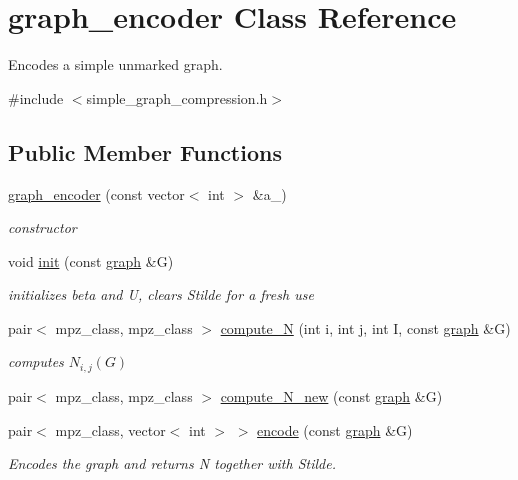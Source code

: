 \hypertarget{classgraph__encoder}{}\section{graph\+\_\+encoder Class Reference}
\label{classgraph__encoder}


Encodes a simple unmarked graph.  




{\ttfamily \#include $<$simple\+\_\+graph\+\_\+compression.\+h$>$}

\subsection*{Public Member Functions}
\begin{DoxyCompactItemize}
\item 
\hyperlink{classgraph__encoder_a571aefbf0b6ad203346fc4e0ef1a33dc}{graph\+\_\+encoder} (const vector$<$ int $>$ \&a\+\_\+)
\begin{DoxyCompactList}\small\item\em constructor \end{DoxyCompactList}\item 
void \hyperlink{classgraph__encoder_a6cfb6fca4bc50d4e5d267060a91f43c3}{init} (const \hyperlink{classgraph}{graph} \&G)
\begin{DoxyCompactList}\small\item\em initializes beta and U, clears Stilde for a fresh use \end{DoxyCompactList}\item 
pair$<$ mpz\+\_\+class, mpz\+\_\+class $>$ \hyperlink{classgraph__encoder_ae7273c47d6dab8367daa5ee6a9cdbc72}{compute\+\_\+N} (int i, int j, int I, const \hyperlink{classgraph}{graph} \&G)
\begin{DoxyCompactList}\small\item\em computes $N_{i,j}(G)$ \end{DoxyCompactList}\item 
pair$<$ mpz\+\_\+class, mpz\+\_\+class $>$ \hyperlink{classgraph__encoder_aeab221523400ec73da6146fdbbd11274}{compute\+\_\+\+N\+\_\+new} (const \hyperlink{classgraph}{graph} \&G)
\item 
pair$<$ mpz\+\_\+class, vector$<$ int $>$ $>$ \hyperlink{classgraph__encoder_a23350e4c0986763b24d14c5ef1beb37e}{encode} (const \hyperlink{classgraph}{graph} \&G)
\begin{DoxyCompactList}\small\item\em Encodes the graph and returns N together with Stilde. \end{DoxyCompactList}\end{DoxyCompactItemize}
